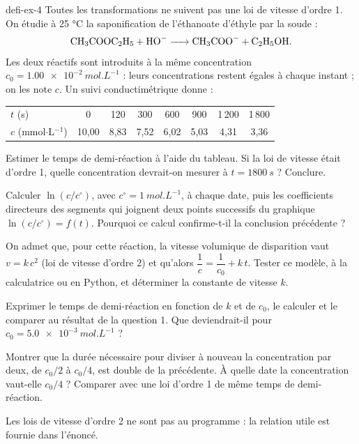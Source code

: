 \begin{blocEdition}{defi-ex-4}
Toutes les transformations ne suivent pas une loi de vitesse d'ordre 1. On étudie à 25 °C la saponification de
l'éthanoate d'éthyle par la soude :
\[\ce{CH3COOC2H5 + HO- -> CH3COO- + C2H5OH}.\]
Les deux réactifs sont introduits à la même concentration $c_0=\qty{1,00e-2}{mol.L^{-1}}$ : leurs concentrations
restent égales à chaque instant ; on les note $c$. Un suivi conductimétrique donne :
\begin{center}\small\renewcommand{\arraystretch}{1.2}
\begin{tabular}{@{}l*{7}{c}@{}}\toprule
$t$ (s) & 0 & 120 & 300 & 600 & 900 & 1\,200 & 1\,800\\
$c$ (mmol$\cdot$L$^{-1}$) & 10,00 & 8,83 & 7,52 & 6,02 & 5,03 & 4,31 & 3,36\\\bottomrule
\end{tabular}\end{center}
\begin{questions}
\item Estimer le temps de demi-réaction à l'aide du tableau. Si la loi de vitesse était d'ordre 1, quelle
concentration devrait-on mesurer à $t=\qty{1800}{s}$ ? Conclure.
\item Calculer $\ln(c/c^\circ)$, avec $c^\circ=\qty{1}{mol.L^{-1}}$, à chaque date, puis les coefficients directeurs
des segments qui joignent deux points successifs du graphique $\ln(c/c^\circ)=f(t)$. Pourquoi ce calcul
confirme-t-il la conclusion précédente ?
\item On admet que, pour cette réaction, la vitesse volumique de disparition vaut $v=k\,c^2$ (loi de vitesse
d'ordre 2) et qu'alors $\dfrac{1}{c}=\dfrac{1}{c_0}+k\,t$. Tester ce modèle, à la calculatrice ou en Python, et
déterminer la constante de vitesse $k$.
\item Exprimer le temps de demi-réaction en fonction de $k$ et de $c_0$, le calculer et le comparer au résultat de la
question 1. Que deviendrait-il pour $c_0=\qty{5,0e-3}{mol.L^{-1}}$ ?
\item Montrer que la durée nécessaire pour diviser à nouveau la concentration par deux, de $c_0/2$ à $c_0/4$, est
double de la précédente. À quelle date la concentration vaut-elle $c_0/4$ ? Comparer avec une loi d'ordre 1 de même
temps de demi-réaction.
\end{questions}
Les lois de vitesse d'ordre 2 ne sont pas au programme : la relation utile est fournie dans l'énoncé.
\end{blocEdition}

